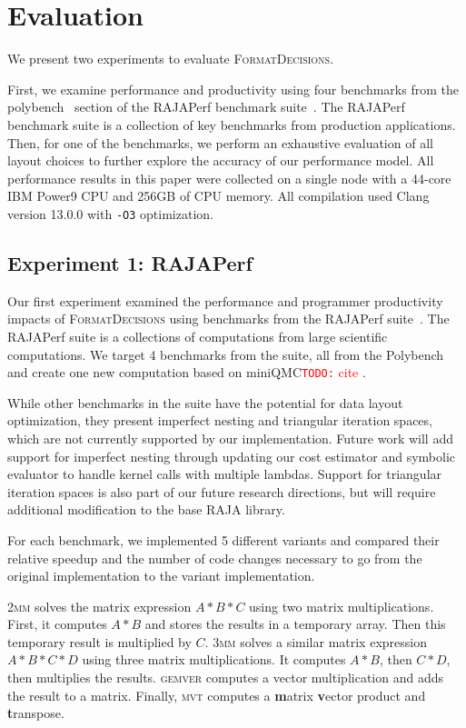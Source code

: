\documentclass[sigconf,review=true]{acmart}
\newcommand{\todo}[1]{{\textcolor{red}{{\tt{TODO:}}\,\,#1 }}}
\newcommand{\FormatDecisions}[0]{{\textsc{FormatDecisions}}}
\begin{document}
\section{Evaluation}
\label{sec:eval}

We present two experiments to evaluate \FormatDecisions. 

First, we examine performance and productivity using four benchmarks from the polybench~\cite{pouchet2012polybench} section of the RAJAPerf benchmark suite~\cite{hornung2017raja}.
The RAJAPerf benchmark suite is a collection of key benchmarks from production applications.
Then, for one of the benchmarks, we perform an exhaustive evaluation of all layout choices to further explore the accuracy of our performance model.
All performance results in this paper were collected on a single node with a 44-core IBM Power9 CPU and 256GB of CPU memory.
All compilation used Clang version 13.0.0 with \verb.-O3. optimization.




\subsection{Experiment 1: RAJAPerf}
\label{sec:Experiment1}
Our first experiment examined the performance and programmer productivity impacts of \FormatDecisions{} using benchmarks from the RAJAPerf suite~\cite{hornung2017raja}.
The RAJAPerf suite is a collections of computations from large scientific computations. 
We target 4 benchmarks from the suite, all from the Polybench~\cite{pouchet2012polybench} and create one new computation based on miniQMC\todo{cite}.


While other benchmarks in the suite have the potential for data layout optimization, they present imperfect nesting and triangular iteration spaces, which are not currently supported by our implementation. 
Future work will add support for imperfect nesting through updating our cost estimator and symbolic evaluator to handle kernel calls with multiple lambdas. 
Support for triangular iteration spaces is also part of our future research directions, but will require additional modification to the base RAJA library.

For each benchmark, we implemented 5 different variants and compared their relative speedup and the number of code changes necessary to go from the original implementation to the variant implementation.



\textsc{2mm} solves the matrix expression $A*B*C$ using two matrix multiplications. 
First, it computes $A*B$ and stores the results in a temporary array.
Then this temporary result is multiplied by $C$.
\textsc{3mm} solves a similar matrix expression $A*B*C*D$ using three matrix multiplications.
It computes $A*B$, then $C*D$, then multiplies the results.
\textsc{gemver} computes a vector multiplication and adds the result to a matrix. 
Finally, \textsc{mvt} computes a \textbf{m}atrix \textbf{v}ector product and \textbf{t}ranspose.
\end{document}
